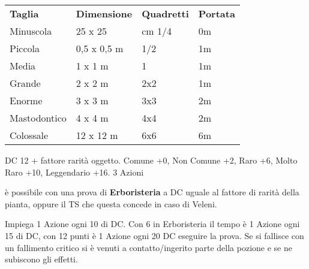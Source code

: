 \documentclass[landscape,10pt,a4paper]{article}
\begin{document}
\begin{multicols}{3}
\begin{dmbox}[title=Cavalcature/Costo/Movimento - pagina \pageref{costicavalcature} - \pageref{tabella-cavalcature-e-veicoli} - \pageref{tipodimovimento}]
\end{dmbox}

\begin{dmbox}[title=Taglia e Portata standard - pagina \pageref{tagliaeportata}]
\begin{tabularx}{0.95\linewidth}{llll}
\toprule
\textbf{Taglia}& \textbf{Dimensione} &\textbf{Quadretti}&\textbf{Portata}\\
Minuscola & 25 x 25 &cm 1/4&0m\\
Piccola & 0,5 x 0,5 m & 1/2&1m\\
Media & 1 x 1 m & 1&1m\\
Grande & 2 x 2 m& 2x2&1m\\
Enorme & 3 x 3 m & 3x3&2m\\
Mastodontico & 4 x 4 m&4x4&2m\\
Colossale & 12 x 12 m&6x6&6m
\end{tabularx}
\end{dmbox}






\begin{dmbox}[title=Valutare - pagina \pageref{valutare}]
DC 12 + fattore rarità oggetto. Comune +0, Non Comune +2, Raro +6, Molto Raro +10, Leggendario +16. 3 Azioni
\end{dmbox}

\begin{dmbox}[title=Identificare una pozione o veleno naturale - pagina \pageref{identificarepozioni}]
	è possibile con una prova di \textbf{Erboristeria} a DC uguale al fattore di rarità della pianta, oppure il TS che questa concede in caso di Veleni.

	Impiega 1 Azione ogni 10 di DC. Con 6 in Erboristeria il tempo è 1 Azione ogni 15 di DC, con 12 punti è 1 Azione ogni 20 DC eseguire la prova. Se si fallisce con un fallimento critico si è venuti a contatto/ingerito parte della pozione e se ne subiscono gli effetti.
\end{dmbox}




\end{multicols}
\end{document}
